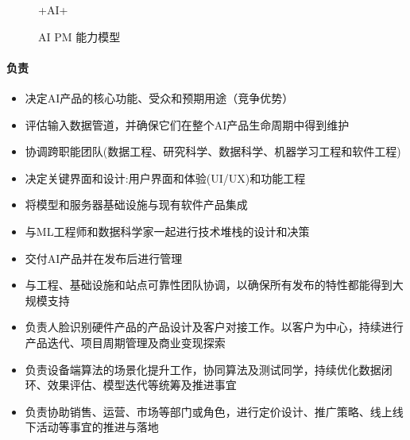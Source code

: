 \documentclass[letterpaper,10pt,english]{sphinxmanual}
\begin{document}
\begin{figure}[H]
\centering
\capstart

\noindent{}
\caption{+AI+\sphinxfootnotemark[272]}\label{\detokenize{chapter_introduction/AI_PM:id49}}\end{figure}
%
\begin{footnotetext}[272]\sphinxAtStartFootnote
{}
%
\end{footnotetext}\ignorespaces 
\begin{figure}[H]
\centering
\capstart

\noindent{}
\caption{AI PM 能力模型}\label{\detokenize{chapter_introduction/AI_PM:id50}}\end{figure}


\paragraph{负责}
\label{\detokenize{chapter_introduction/AI_PM:id11}}\begin{itemize}
\item {} 
决定AI产品的核心功能、受众和预期用途（竞争优势）

\item {} 
评估输入数据管道，并确保它们在整个AI产品生命周期中得到维护

\item {} 
协调跨职能团队(数据工程、研究科学、数据科学、机器学习工程和软件工程)

\item {} 
决定关键界面和设计:用户界面和体验(UI/UX)和功能工程

\item {} 
将模型和服务器基础设施与现有软件产品集成

\item {} 
与ML工程师和数据科学家一起进行技术堆栈的设计和决策

\item {} 
交付AI产品并在发布后进行管理

\item {} 
与工程、基础设施和站点可靠性团队协调，以确保所有发布的特性都能得到大规模支持

\item {} 
负责人脸识别硬件产品的产品设计及客户对接工作。以客户为中心，持续进行产品迭代、项目周期管理及商业变现探索

\item {} 
负责设备端算法的场景化提升工作，协同算法及测试同学，持续优化数据闭环、效果评估、模型迭代等统筹及推进事宜

\item {} 
负责协助销售、运营、市场等部门或角色，进行定价设计、推广策略、线上线下活动等事宜的推进与落地
%
\begin{footnote}[273]\sphinxAtStartFootnote
{}
%
\end{footnote}

\end{itemize}
\end{document}
